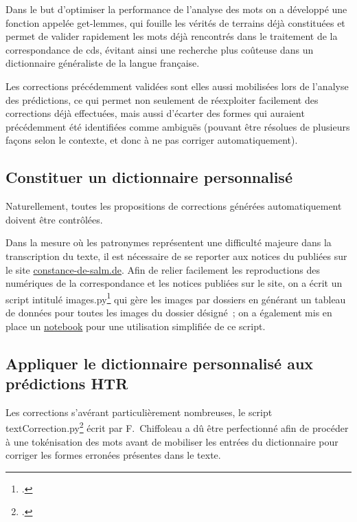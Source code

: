 \documentclass[a4paper,12pt,twoside]{book}
\begin{document}
				Dans le but d'optimiser la performance de l'analyse des mots on a développé une fonction appelée \textsf{get-lemmes}, qui fouille les vérités de terrains déjà constituées et permet de valider rapidement les mots déjà rencontrés dans le traitement de la correspondance de \gls{cds}, évitant ainsi une recherche plus coûteuse dans un dictionnaire généraliste de la langue française.
				
				Les corrections précédemment validées sont elles aussi mobilisées lors de l'analyse des prédictions, ce qui permet non seulement de réexploiter facilement des corrections déjà effectuées, mais aussi d'écarter des formes qui auraient précédemment été identifiées comme ambiguës (pouvant être résolues de plusieurs façons selon le contexte, et donc à ne pas corriger automatiquement).
				
			\subsection{Constituer un dictionnaire personnalisé}
				Naturellement, toutes les propositions de corrections générées automatiquement doivent être contrôlées.
				
				Dans la mesure où les patronymes représentent une difficulté majeure dans la transcription du texte, il est nécessaire de se reporter aux notices du publiées sur le site \href{https://constance-de-salm.de}{constance-de-salm.de}. Afin de relier facilement les reproductions des numériques de la correspondance et les notices publiées sur le site, on a écrit un script intitulé \textsf{images.py}\footcite{biayImagesPy2022} qui gère les images par dossiers en générant un tableau de données pour toutes les images du dossier désigné~; on a également mis en place un \href{https://github.com/sbiay/CdS-edition/blob/main/donnees/Obtenir_metadonnees_images.ipynb}{notebook} pour une utilisation simplifiée de ce script.

			\subsection{Appliquer le dictionnaire personnalisé aux prédictions HTR}
				Les corrections s'avérant particulièrement nombreuses, le script \textsf{textCorrection.py}\footcite{biayTextCorrectionPy2022} écrit par F.~Chiffoleau a dû être perfectionné afin de procéder à une tokénisation des mots avant de mobiliser les entrées du dictionnaire pour corriger les formes erronées présentes dans le texte.
				
\end{document}
